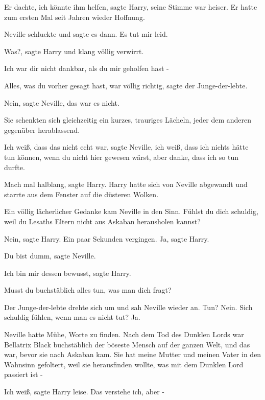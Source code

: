 \glqq{}Er dachte, ich könnte ihm helfen\grqq{}, sagte Harry, seine Stimme war
heiser. \glqq{}Er hatte zum ersten Mal seit Jahren wieder Hoffnung.\grqq{}

Neville schluckte und sagte es dann. \glqq{}Es tut mir leid.\grqq{}

\glqq{}Was?\grqq{}, sagte Harry und klang völlig verwirrt.

\glqq{}Ich war dir nicht dankbar, als du mir geholfen hast -\grqq{}

\glqq{}Alles, was du vorher gesagt hast, war völlig richtig\grqq{}, sagte der
Junge-der-lebte.

\glqq{}Nein\grqq{}, sagte Neville, \glqq{}das war es nicht.\grqq{}

Sie schenkten sich gleichzeitig ein kurzes, trauriges Lächeln, jeder dem anderen
gegenüber herablassend.

\glqq{}Ich weiß, dass das nicht echt war\grqq{}, sagte Neville, \glqq{}ich weiß,
dass ich nichts hätte tun können, wenn du nicht hier gewesen wärst, aber danke,
dass ich so tun durfte.\grqq{}

\glqq{}Mach mal halblang\grqq{}, sagte Harry. Harry hatte sich von Neville
abgewandt und starrte aus dem Fenster auf die düsteren Wolken.

Ein völlig lächerlicher Gedanke kam Neville in den Sinn. \glqq{}Fühlst du dich
schuldig, weil du Lesaths Eltern nicht aus Askaban herausholen kannst?\grqq{}

\glqq{}Nein\grqq{}, sagte Harry. Ein paar Sekunden vergingen. \glqq{}Ja\grqq{},
sagte Harry.

\glqq{}Du bist dumm\grqq{}, sagte Neville.

\glqq{}Ich bin mir dessen bewusst\grqq{}, sagte Harry.

\glqq{}Musst du buchstäblich alles tun, was man dich fragt?\grqq{}

Der Junge-der-lebte drehte sich um und sah Neville wieder an. \glqq{}Tun? Nein.
Sich schuldig fühlen, wenn man es nicht tut? Ja.\grqq{}

Neville hatte Mühe, Worte zu finden. \glqq{}Nach dem Tod des Dunklen Lords war
Bellatrix Black buchstäblich der böseste Mensch auf der ganzen Welt, und das
war, bevor sie nach Askaban kam. Sie hat meine Mutter und meinen Vater in den
Wahnsinn gefoltert, weil sie herausfinden wollte, was mit dem Dunklen Lord
passiert ist -\grqq{}

\glqq{}Ich weiß\grqq{}, sagte Harry leise. \glqq{}Das verstehe ich, aber -\grqq{}

